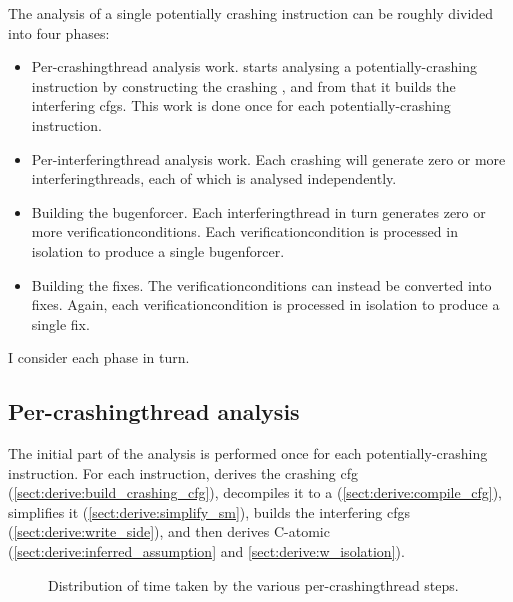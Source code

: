 The analysis of a single potentially crashing instruction can be
roughly divided into four phases:
\begin{itemize}
\item Per-\gls{crashingthread} analysis work.  {\Technique} starts
  analysing a potentially-crashing instruction by constructing the
  crashing {\StateMachine}, and from that it builds the interfering
  \glspl{cfg}.  This work is done once for each potentially-crashing
  instruction.
\item Per-\gls{interferingthread} analysis work.  Each crashing
  {\StateMachine} will generate zero or more
  \glspl{interferingthread}, each of which is analysed independently.
\item Building the \gls{bugenforcer}.  Each \gls{interferingthread} in
  turn generates zero or more \glspl{verificationcondition}.  Each
  \gls{verificationcondition} is processed in isolation to produce a
  single \gls{bugenforcer}.
\item Building the fixes.  The \glspl{verificationcondition} can
  instead be converted into fixes.  Again, each
  \gls{verificationcondition} is processed in isolation to produce a
  single fix.
\end{itemize}
I consider each phase in turn.

\subsection{Per-\gls{crashingthread} analysis}

The initial part of the analysis is performed once for each
potentially-crashing instruction.  For each instruction, {\technique}
derives the crashing \gls{cfg}
(\autoref{sect:derive:build_crashing_cfg}), decompiles it to a
{\StateMachine} (\autoref{sect:derive:compile_cfg}), simplifies it
(\autoref{sect:derive:simplify_sm}), builds the interfering
\glspl{cfg} (\autoref{sect:derive:write_side}), and then derives
C-atomic (\autoref{sect:derive:inferred_assumption} and
\autoref{sect:derive:w_isolation}).

\begin{figure}
  \centerline{
  }
  \caption{Distribution of time taken by the various
    per-\gls{crashingthread} steps. \label{fig:eval:how:per_crashing_times}}
\end{figure}

